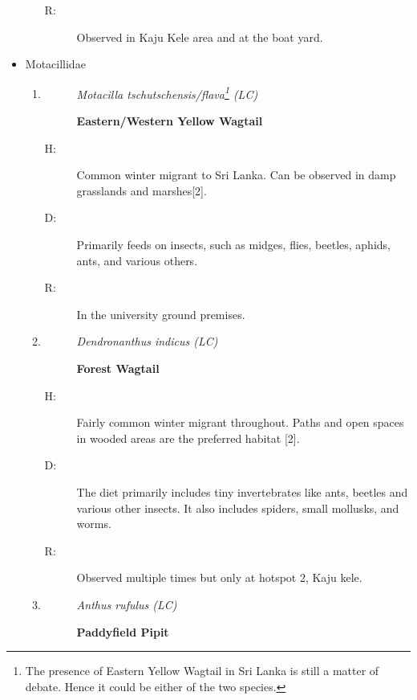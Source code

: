\begin{itemize}
\begin{enumerate}
\begin{description}
\item[R: ]%
Observed in Kaju Kele area and at the boat yard.%
\end{description}%
\end{enumerate}%
\item%
Motacillidae%
\begin{enumerate}%
\item%
\begin{description}%
\item[]%
\textit{Motacilla tschutschensis/flava\footnote{The presence of Eastern Yellow Wagtail in Sri Lanka is still a matter of debate. Hence it could be either of the two species. } (LC)}%
\item[]%
\textbf{Eastern/Western Yellow Wagtail}%
\end{description}%
\begin{description}%
\item[H: ]%
Common winter migrant to Sri Lanka. Can be observed in damp grasslands and marshes{[}2{]}.%
\item[D: ]%
Primarily feeds on insects, such as midges, flies, beetles, aphids, ants, and various others.%
\item[R: ]%
In the university ground premises.%
\end{description}%
\item%
\begin{description}%
\item[]%
\textit{Dendronanthus indicus (LC)}%
\item[]%
\textbf{Forest Wagtail}%
\end{description}%
\begin{description}%
\item[H: ]%
Fairly common winter migrant throughout. Paths and open spaces in wooded areas are the preferred habitat
{[}2{]}.%
\item[D: ]%
The diet primarily includes tiny invertebrates like ants, beetles and various other insects. It also includes spiders, small mollusks, and worms.%
\item[R: ]%
Observed multiple times but only at hotspot 2, Kaju kele.%
\end{description}%
\item%
\begin{description}%
\item[]%
\textit{Anthus rufulus (LC)}%
\item[]%
\textbf{Paddyfield Pipit}%
\end{description}%

\end{enumerate}
\end{itemize}
